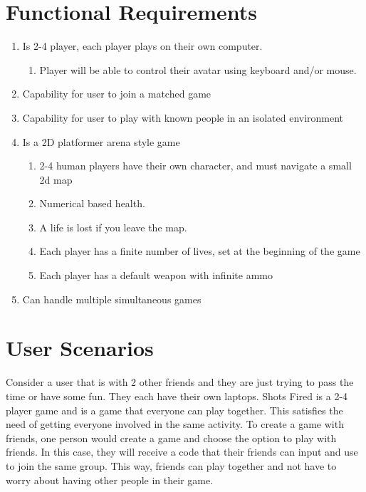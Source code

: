 \documentclass[11pt, oneside]{article}   	%
\begin{document}
\clearpage

\section{Functional Requirements}
\begin{enumerate}
\item Is 2-4 player, each player plays on their own computer. 
\begin{enumerate}
\item Player will be able to control their avatar using keyboard and/or mouse. 
\end{enumerate}
\item Capability for user to join a matched game
\item Capability for user to play with known people in an isolated environment
\item Is a 2D platformer arena style game
\begin{enumerate}
\item 2-4 human players have their own character, and must navigate a small 2d map
\item Numerical based health.
\item A life is lost if you leave the map.
\item Each player has a finite number of lives, set at the beginning of the game
\item Each player has a default weapon with infinite ammo
\end{enumerate}
\item Can handle multiple simultaneous games
\end{enumerate}

\section{User Scenarios}

Consider a user that is with 2 other friends and they are just trying to pass the time or have some fun. They each have their own laptops. Shots Fired is a 2-4 player game and is a game that everyone can play together. This satisfies the need of getting everyone involved in the same activity. To create a game with friends, one person would create a game and choose the option to play with friends. In this case, they will receive a code that their friends can input and use to join the same group. This way, friends can play together and not have to worry about having other people in their game. \\
\end{document}
